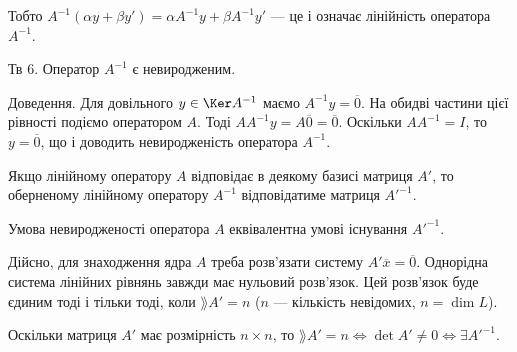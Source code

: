 Тобто $A^{-1}(\alpha y + \beta y') = \alpha A^{-1} y + \beta A^{-1} y'$ --- це і означає лінійність оператора $A^{-1}$.


Тв 6. Оператор $A^{-1}$ є невиродженим.

Доведення. Для довільного $y \in \Ker A^{-1}$ маємо $A^{-1} y = \overline{0}$. На обидві частини
цієї рівності подіємо оператором $A$. Тоді $A A^{-1} y = A \overline{0} = \overline{0}$. Оскільки
$A A^{-1} = I$, то $y = \overline{0}$, що і доводить невиродженість оператора $A^{-1}$.


Якщо лінійному оператору $A$ відповідає в деякому базисі матриця $A'$, то
оберненому лінійному оператору $A^{-1}$ відповідатиме матриця $A'^{-1}$.


Умова невиродженості оператора $A$ еквівалентна умові існування $A'^{-1}$.

Дійсно, для знаходження ядра $A$ треба розв’язати систему $A'\overline{x} = \overline{0}$. Однорідна
система лінійних рівнянь завжди має нульовий розв’язок. Цей розв’язок буде
єдиним тоді і тільки тоді, коли $\rang A' = n$ ($n$ --- кількість невідомих, $n = \dim L$).

Оскільки матриця $A'$ має розмірність $n \times n$, то $\rang A' = n \Leftrightarrow \det A' \neq 0 \Leftrightarrow \exists A'^{-1}$.


